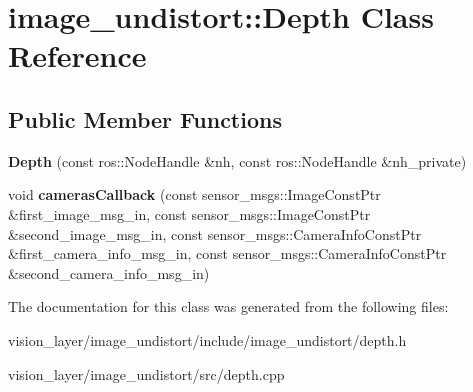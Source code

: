 \hypertarget{classimage__undistort_1_1Depth}{}\section{image\+\_\+undistort\+:\+:Depth Class Reference}
\label{classimage__undistort_1_1Depth}
\subsection*{Public Member Functions}
\begin{DoxyCompactItemize}
\item 
\mbox{\label{classimage__undistort_1_1Depth_a26bd724e80c82d7fe75c321b191b9cc0}} 
{\bfseries Depth} (const ros\+::\+Node\+Handle \&nh, const ros\+::\+Node\+Handle \&nh\+\_\+private)
\item 
\mbox{\label{classimage__undistort_1_1Depth_a9a8f3bc5b26f64c3ebbd549cf25bb029}} 
void {\bfseries cameras\+Callback} (const sensor\+\_\+msgs\+::\+Image\+Const\+Ptr \&first\+\_\+image\+\_\+msg\+\_\+in, const sensor\+\_\+msgs\+::\+Image\+Const\+Ptr \&second\+\_\+image\+\_\+msg\+\_\+in, const sensor\+\_\+msgs\+::\+Camera\+Info\+Const\+Ptr \&first\+\_\+camera\+\_\+info\+\_\+msg\+\_\+in, const sensor\+\_\+msgs\+::\+Camera\+Info\+Const\+Ptr \&second\+\_\+camera\+\_\+info\+\_\+msg\+\_\+in)
\end{DoxyCompactItemize}


The documentation for this class was generated from the following files\+:\begin{DoxyCompactItemize}
\item 
vision\+\_\+layer/image\+\_\+undistort/include/image\+\_\+undistort/depth.\+h\item 
vision\+\_\+layer/image\+\_\+undistort/src/depth.\+cpp\end{DoxyCompactItemize}
